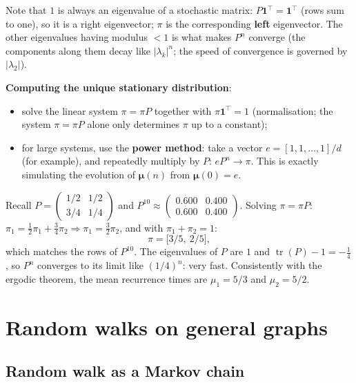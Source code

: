 Note that $1$ is always an eigenvalue of a stochastic matrix: $P\mathbf{1}^\top = \mathbf{1}^\top$ (rows sum to one), so it is a right eigenvector; $\pi$ is the corresponding \textbf{left} eigenvector. The other eigenvalues having modulus $< 1$ is what makes $P^n$ converge (the components along them decay like $|\lambda_k|^n$; the speed of convergence is governed by $|\lambda_2|$).

\textbf{Computing the unique stationary distribution}:
\begin{itemize}
    \item solve the linear system $\pi = \pi P$ together with $\pi\mathbf{1}^\top = 1$ (normalisation; the system $\pi = \pi P$ alone only determines $\pi$ up to a constant);
    \item for large systems, use the \textbf{power method}: take a vector $e = [1, 1, \dots, 1]/d$ (for example), and repeatedly multiply by $P$: $eP^n \to \pi$. This is exactly simulating the evolution of $\boldsymbol{\mu}(n)$ from $\boldsymbol{\mu}(0) = e$.
\end{itemize}

\begin{remark}
Recall $P = \begin{pmatrix} 1/2 & 1/2 \\ 3/4 & 1/4 \end{pmatrix}$ and $P^{10} \approx \begin{pmatrix} 0.600 & 0.400 \\ 0.600 & 0.400 \end{pmatrix}$. Solving $\pi = \pi P$: $\pi_1 = \frac12\pi_1 + \frac34\pi_2 \Rightarrow \pi_1 = \frac32\pi_2$, and with $\pi_1 + \pi_2 = 1$:
\[
\pi = \big[3/5,\ 2/5\big],
\]
which matches the rows of $P^{10}$. The eigenvalues of $P$ are $1$ and $\operatorname{tr}(P) - 1 = -\frac14$, so $P^n$ converges to its limit like $(1/4)^n$: very fast. Consistently with the ergodic theorem, the mean recurrence times are $\mu_1 = 5/3$ and $\mu_2 = 5/2$.
\end{remark}

\section{Random walks on general graphs}

\subsection{Random walk as a Markov chain}

